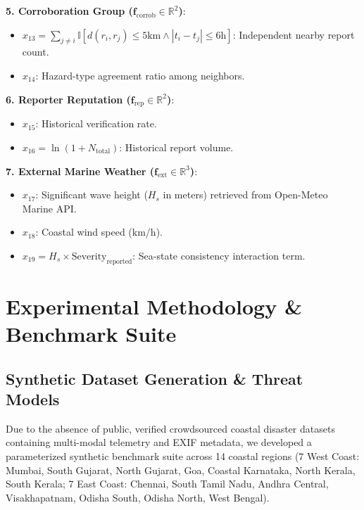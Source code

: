 \documentclass[conference]{IEEEtran}
\begin{document}
\textbf{5. Corroboration Group ($\mathbf{f}_{\text{corrob}} \in \mathbb{R}^2$)}:
\begin{itemize}
    \item $x_{13} = \sum_{j \neq i} \mathbb{I}[d(r_i, r_j) \le 5\text{km} \land |t_i - t_j| \le 6\text{h}]$: Independent nearby report count.
    \item $x_{14}$: Hazard-type agreement ratio among neighbors.
\end{itemize}

\textbf{6. Reporter Reputation ($\mathbf{f}_{\text{rep}} \in \mathbb{R}^2$)}:
\begin{itemize}
    \item $x_{15}$: Historical verification rate.
    \item $x_{16} = \ln(1 + N_{\text{total}})$: Historical report volume.
\end{itemize}

\textbf{7. External Marine Weather ($\mathbf{f}_{\text{ext}} \in \mathbb{R}^3$)}:
\begin{itemize}
    \item $x_{17}$: Significant wave height ($H_s$ in meters) retrieved from Open-Meteo Marine API.
    \item $x_{18}$: Coastal wind speed (km/h).
    \item $x_{19} = H_s \times \text{Severity}_{\text{reported}}$: Sea-state consistency interaction term.
\end{itemize}

\section{Experimental Methodology \& Benchmark Suite}
\subsection{Synthetic Dataset Generation \& Threat Models}
Due to the absence of public, verified crowdsourced coastal disaster datasets containing multi-modal telemetry and EXIF metadata, we developed a parameterized synthetic benchmark suite across 14 coastal regions (7 West Coast: Mumbai, South Gujarat, North Gujarat, Goa, Coastal Karnataka, North Kerala, South Kerala; 7 East Coast: Chennai, South Tamil Nadu, Andhra Central, Visakhapatnam, Odisha South, Odisha North, West Bengal).
\end{document}
